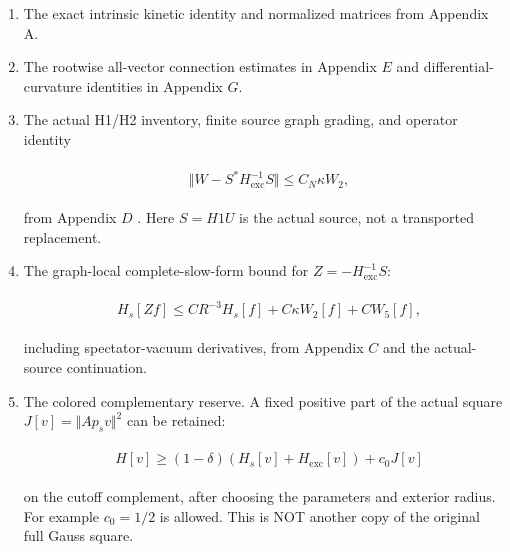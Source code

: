 \begin{enumerate}
\def\labelenumi{\arabic{enumi}.}
\item
  The exact intrinsic kinetic identity and normalized matrices from
  Appendix A.
\item
  The rootwise all-vector connection estimates in Appendix \(E\) and
  differential-curvature identities in Appendix \(G\).
\item
  The actual H1/H2 inventory, finite source graph grading, and operator
  identity

  \begin{gather*}
  \begin{aligned}
  & \Vert W-S^{*}H_{\mathrm{exc}}^{-1}S\Vert  \le  C_{N} \kappa  W_{2},
  \end{aligned}\tag{1.3}
  \end{gather*}

  from Appendix \(D\) . Here \(S=H1 U\) is the actual source, not a
  transported replacement.
\item
  The graph-local complete-slow-form bound for
  \(Z=-H_{\mathrm{exc}}^{-1}S\):

  \begin{gather*}
  \begin{aligned}
  & H_{s}[Zf] \le  C R^{-3}H_{s}[f]+C \kappa  W_{2}[f]+C W_{5}[f],
  \end{aligned}\tag{1.4}
  \end{gather*}

  including spectator-vacuum derivatives, from Appendix \(C\) and the
  actual-source continuation.
\item
  The colored complementary reserve. A fixed positive part of the actual
  square \(J[v]=\Vert A p_{s} v\Vert ^{2}\) can be retained:

  \begin{gather*}
  \begin{aligned}
  & H[v] \ge  (1-\delta )(H_{s}[v]+H_{\mathrm{exc}}[v])+c_{0} J[v]
  \end{aligned}\tag{1.5}
  \end{gather*}

  on the cutoff complement, after choosing the parameters and exterior
  radius. For example \(c_{0}=1/2\) is allowed. This is NOT another copy
  of the original full Gauss square.
\end{enumerate}


